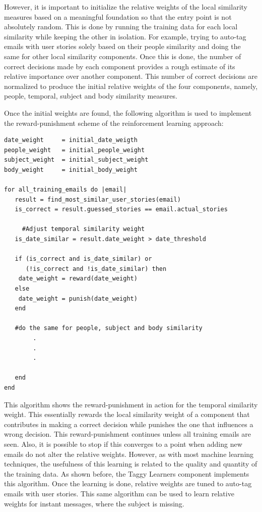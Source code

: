 However, it is important to initialize the relative weights of the local similarity measures based on a meaningful foundation so that the entry point is not absolutely random. This is done by running the training data for each local similarity while keeping the other in isolation. For example, trying to auto-tag emails with user stories solely based on their people similarity and doing the same for other local similarity components. Once this is done, the number of correct decisions made by each component provides a rough estimate of its relative importance over another component. This number of correct decisions are normalized to produce the initial relative weights of the four components, namely, people, temporal, subject and body similarity measures.

Once the initial weights are found, the following algorithm is used to implement the reward-punishment scheme of the reinforcement learning approach:

\begin{verbatim}
date_weight     = initial_date_weigth
people_weight   = initial_people_weight
subject_weight  = initial_subject_weight
body_weight     = initial_body_weight

for all_training_emails do |email|
   result = find_most_similar_user_stories(email)
   is_correct = result.guessed_stories == email.actual_stories

	 #Adjust temporal similarity weight
   is_date_similar = result.date_weight > date_threshold

   if (is_correct and is_date_similar) or 
      (!is_correct and !is_date_similar) then
    date_weight = reward(date_weight)
   else
    date_weight = punish(date_weight)
   end

   #do the same for people, subject and body similarity
		.
		.
		.
		
   end
end
\end{verbatim}
This algorithm shows the reward-punishment in action for the temporal similarity weight. This essentially rewards the local similarity weight of a component that contributes in making a correct decision while punishes the one that influences a wrong decision. This reward-punishment continues unless all training emails are seen. Also, it is possible to stop if this converges to a point when adding new emails do not alter the relative weights. However, as with most machine learning techniques, the usefulness of this learning is related to the quality and quantity of the training data. As shown before, the Taggy Learners component implements this algorithm. Once the learning is done, relative weights are tuned to auto-tag emails with user stories. This same algorithm can be used to learn relative weights for instant messages, where the subject is missing.

